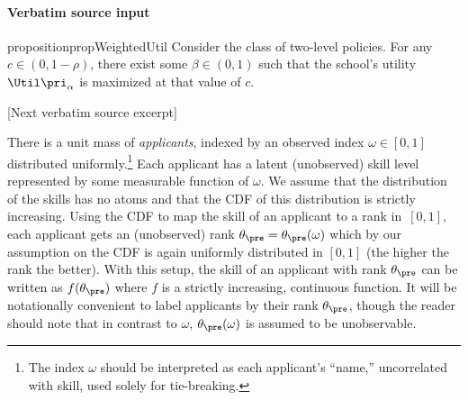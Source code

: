 \documentclass[10pt]{article}
\begin{document}
\paragraph{Verbatim source input}
\begin{ReviewVerbatim}
\begin{restatable}{proposition}{propWeightedUtil}\label{prop:2levels-fixedcap}
	Consider the class of two-level policies. For any $c \in (0,1-\rho)$, there exist some $\beta \in (0,1)$ such that the school's utility $\Util\pri_\alpha$ is maximized at that value of $c$.
\end{restatable}

[Next verbatim source excerpt]

There is a unit mass of \textit{applicants}, indexed by an observed index $\omega \in [0,1]$ distributed uniformly.\footnote{The index $\omega$ should be interpreted as each applicant's ``name,'' uncorrelated with skill, used solely for tie-breaking.}  Each applicant has a latent (unobserved) skill level represented by some measurable function of $\omega$.
We assume that {the distribution of the skills} has no atoms and that the CDF of this distribution is strictly increasing.
Using the CDF to map the skill of an applicant to a rank in~$[0,1]$, each applicant gets an (unobserved) rank $\theta_\pre =\theta_\pre(\omega)$ which by our assumption on the CDF is again uniformly distributed in $[0, 1]$ (the higher the rank the better).  With this setup, the skill of an applicant with rank $\theta_\pre$ can be written as $f(\theta_\pre)$ where $f$ is a strictly increasing, continuous function.  {It will be notationally convenient to label applicants by their rank $\theta_\pre$, though the reader should note that in contrast to $\omega$, $\theta_\pre(\omega)$ is assumed to be unobservable.}




\end{ReviewVerbatim}
\end{document}
